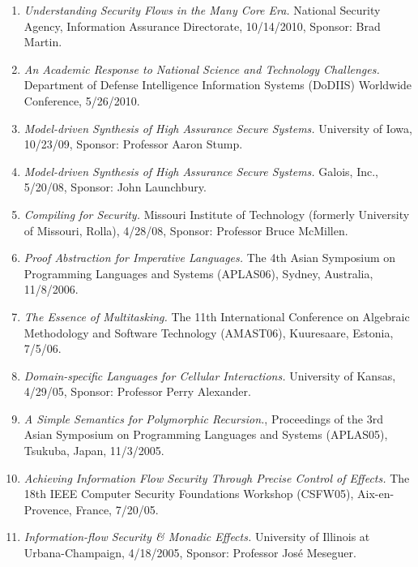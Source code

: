 \documentclass[12pt]{article} %
\begin{document}
\begin{enumerate}[leftmargin=0mm]
\item{\it Understanding Security Flows in the Many Core Era.}
National Security Agency, Information Assurance Directorate, 
10/14/2010, Sponsor: Brad Martin.

\item{\it An Academic Response to National Science and Technology Challenges.}
Department of Defense Intelligence Information Systems (DoDIIS) Worldwide Conference, 5/26/2010.

\item{\it Model-driven Synthesis of High Assurance Secure Systems.} University of Iowa, 10/23/09, Sponsor: Professor Aaron Stump.

\item{\it Model-driven Synthesis of High Assurance Secure Systems.} Galois, Inc., 5/20/08, Sponsor: John Launchbury.


\item{\it Compiling for Security.} Missouri Institute of Technology (formerly University of Missouri, Rolla), 4/28/08, Sponsor: Professor Bruce McMillen.

\item{\it Proof Abstraction for Imperative Languages.} The 4th Asian Symposium on Programming Languages and Systems (APLAS06), Sydney, Australia, 11/8/2006. 

\item{\it The Essence of Multitasking.} The 11th International Conference on Algebraic Methodology and Software Technology (AMAST06), Kuuresaare, Estonia, 7/5/06.

\item{\it Domain-specific Languages for Cellular Interactions.} University of Kansas, 4/29/05, Sponsor: Professor Perry Alexander. 

\item{\it A Simple Semantics for Polymorphic Recursion.}, Proceedings of the 3rd Asian Symposium on Programming Languages and Systems (APLAS05), Tsukuba, Japan, 11/3/2005.

\item{\it Achieving Information Flow Security Through Precise Control of Effects.} The 18th IEEE Computer Security Foundations Workshop (CSFW05), Aix-en-Provence, France, 7/20/05.

\item{\it Information-flow Security \& Monadic Effects.}
University of Illinois at Urbana-Champaign, 4/18/2005, Sponsor:
Professor Jos\'{e} Meseguer.


\end{enumerate}
\end{document}
